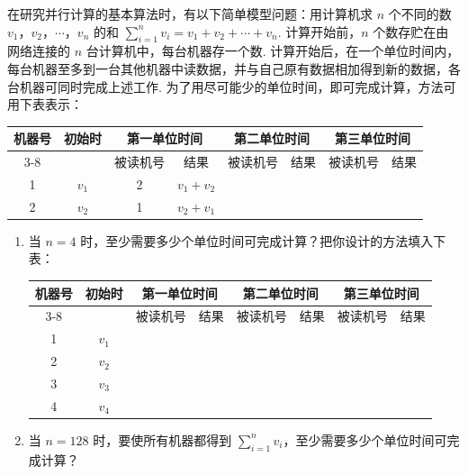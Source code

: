 \begin{problem}
在研究并行计算的基本算法时，有以下简单模型问题：用计算机求 \(n\) 个不同的数 \(v_{1}\)，\(v_{2}\)，\(\cdots\)，\(v_{n}\) 的和 \(\sum_{i=1}^{n}v_{i}=v_{1}+v_{2}+\cdots+v_{n}\). 计算开始前，\(n\) 个数存贮在由网络连接的 \(n\) 台计算机中，每台机器存一个数. 计算开始后，在一个单位时间内，每台机器至多到一台其他机器中读数据，并与自己原有数据相加得到新的数据，各台机器可同时完成上述工作. 为了用尽可能少的单位时间，即可完成计算，方法可用下表表示：

\begin{center}
\begin{tabular}{|c|c|cc|cc|cc|}
\hline
机器号 & 初始时 & \multicolumn{2}{c|}{第一单位时间} & \multicolumn{2}{c|}{第二单位时间} & \multicolumn{2}{c|}{第三单位时间} \\
\cline{3-8}
 &  & 被读机号 & 结果 & 被读机号 & 结果 & 被读机号 & 结果 \\
\hline
1 & \(v_{1}\) & 2 & \(v_{1}+v_{2}\) &  &  &  & \\
\hline
2 & \(v_{2}\) & 1 & \(v_{2}+v_{1}\) &  &  &  & \\
\hline
\end{tabular}
\end{center}

\begin{enumerate}
\item 当 \(n=4\) 时，至少需要多少个单位时间可完成计算？把你设计的方法填入下表：

\begin{center}
\begin{tabular}{|c|c|cc|cc|cc|}
\hline
机器号 & 初始时 & \multicolumn{2}{c|}{第一单位时间} & \multicolumn{2}{c|}{第二单位时间} & \multicolumn{2}{c|}{第三单位时间} \\
\cline{3-8}
 &  & 被读机号 & 结果 & 被读机号 & 结果 & 被读机号 & 结果 \\
\hline
1 & \(v_{1}\) &  &  &  &  &  & \\
\hline
2 & \(v_{2}\) &  &  &  &  &  & \\
\hline
3 & \(v_{3}\) &  &  &  &  &  & \\
\hline
4 & \(v_{4}\) &  &  &  &  &  & \\
\hline
\end{tabular}
\end{center}

\item 当 \(n=128\) 时，要使所有机器都得到 \(\sum_{i=1}^{n}v_{i}\)，至少需要多少个单位时间可完成计算？
\end{enumerate}
\end{problem}

